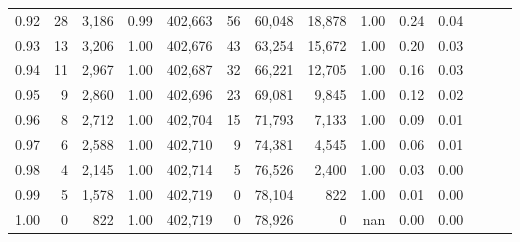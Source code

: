 \begin{tabular}{rrrrrrrrrrrrrr}
0.92 &     28 &  3,186 &  0.99 &  402,663 &       56 &  60,048 &  18,878 &  1.00 &  0.24 &      0.04 \\
0.93 &     13 &  3,206 &  1.00 &  402,676 &       43 &  63,254 &  15,672 &  1.00 &  0.20 &      0.03 \\
0.94 &     11 &  2,967 &  1.00 &  402,687 &       32 &  66,221 &  12,705 &  1.00 &  0.16 &      0.03 \\
0.95 &      9 &  2,860 &  1.00 &  402,696 &       23 &  69,081 &   9,845 &  1.00 &  0.12 &      0.02 \\
0.96 &      8 &  2,712 &  1.00 &  402,704 &       15 &  71,793 &   7,133 &  1.00 &  0.09 &      0.01 \\
0.97 &      6 &  2,588 &  1.00 &  402,710 &        9 &  74,381 &   4,545 &  1.00 &  0.06 &      0.01 \\
0.98 &      4 &  2,145 &  1.00 &  402,714 &        5 &  76,526 &   2,400 &  1.00 &  0.03 &      0.00 \\
0.99 &      5 &  1,578 &  1.00 &  402,719 &        0 &  78,104 &     822 &  1.00 &  0.01 &      0.00 \\
1.00 &      0 &    822 &  1.00 &  402,719 &        0 &  78,926 &       0 &   nan &  0.00 &      0.00 \\
\bottomrule
\end{tabular}
